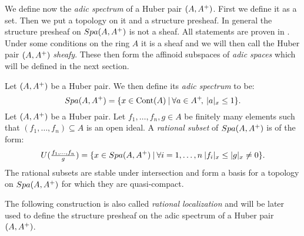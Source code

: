 We define now the \emph{adic spectrum} of a Huber pair $(A,A{^{+}})$. First we define it as a set. Then we put a topology on it and a structure presheaf. In general the structure presheaf on  ${Spa({A},{A{^{+}}})}$ is not a sheaf. All statements are proven in \cite{Huber94}. Under some conditions on the ring $A$ it is a sheaf and we will then call the Huber pair  $(A,A{^{+}})$ \emph{sheafy}. These then form the affinoid subspaces of \emph{adic spaces} which will be defined in the next section.

\begin{definition}
Let $(A,A{^{+}})$ be a Huber pair. We then define its \emph{adic spectrum} to be:
\[{Spa({A},{A{^{+}}})} = \{x\in{\mathrm{Cont}(A)}\:\vert\: \forall a\in A{^{+}}\!,\: \lvert a\rvert_{x}\leq1\}.\]
Let $(A,A{^{+}})$ be a Huber pair. Let $f_1,\dots,f_n,g\in A$ be finitely many elements such that 
$(f_1,\dots,f_n)\subseteq A$ is an open ideal. A \emph{rational subset} of ${Spa({A},{A{^{+}}})}$ is of the form:
\[U(\tfrac{f_1,\dots,f_n}{g}) = \{x\in{Spa({A},{A{^{+}}})}\:\vert\: \forall i=1,\dots,n\: \lvert f_i\rvert_{x}\leq\lvert g\rvert_{x}\neq0\}.\]
The rational subsets are stable under intersection and form a basis for a topology on ${Spa({A},{A{^{+}}})}$ for which they are quasi-compact.
\end{definition}

The following construction is also called \emph{rational localization} and will be later used to define the structure presheaf on the adic spectrum of a Huber pair $(A, A{^{+}})$.

